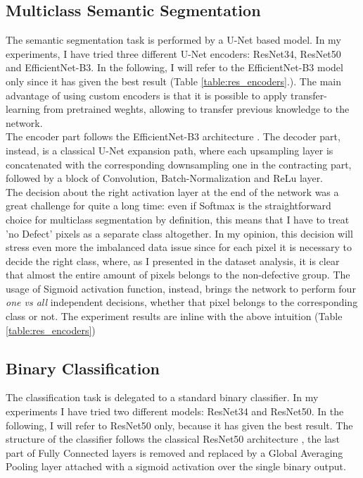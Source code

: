 \documentclass[10pt,twocolumn,letterpaper]{article}
\begin{document}
   \subsection{Multiclass Semantic Segmentation}
   The semantic segmentation task is performed by a U-Net based model. In my experiments, I have tried three different U-Net encoders: ResNet34, ResNet50 and EfficientNet-B3. In the following, I will refer to the EfficientNet-B3 model only since it has given the best result (Table \ref{table:res_encoders}.).
   The main advantage of using custom encoders is that it is possible to apply transfer-learning from pretrained weghts, allowing to transfer previous knowledge to the network. \\
   The encoder part follows the EfficientNet-B3 architecture \cite{efficientnet}. The decoder part, instead, is a classical U-Net expansion path, where each upsampling layer is concatenated with the corresponding downsampling one in the contracting part, followed by a block of Convolution, Batch-Normalization and ReLu layer. \\
   The decision about the right activation layer at the end of the network was a great challenge for quite a long time: even if Softmax is the straightforward choice for multiclass segmentation by definition, this means that I have to treat 'no Defect' pixels as a separate class altogether. In my opinion, this decision will stress even more the imbalanced data issue since for each pixel it is necessary to decide the right class, where, as I presented in the dataset analysis, it is clear that almost the entire amount of pixels belongs to the non-defective group. The usage of Sigmoid activation function, instead, brings the network to perform four \textit{one vs all} independent decisions, whether that pixel belongs to the corresponding class or not. The experiment results are inline with the above intuition (Table \ref{table:res_encoders})

   \subsection{Binary Classification}
   The classification task is delegated to a standard binary classifier. In my experiments I have tried two different models: ResNet34 and ResNet50. In the following, I will refer to ResNet50 only, because it has given the best result.
   The structure of the classifier follows the classical ResNet50 architecture \cite{resnet}, the last part of Fully Connected layers is removed and replaced by a Global Averaging Pooling layer attached with a sigmoid activation over the single binary output.
\end{document}
